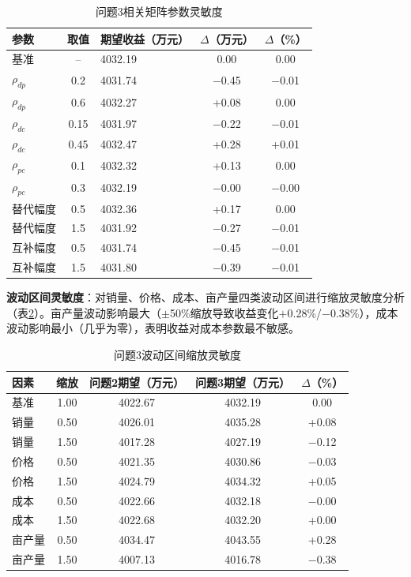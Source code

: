 \documentclass[12pt,a4paper]{article}
\begin{document}
\begin{table}[H]
\centering
\caption{问题3相关矩阵参数灵敏度}
\label{tab:sens_rho}
\begin{tabular}{lclcc}
\toprule
参数 & 取值 & 期望收益（万元） & $\Delta$（万元） & $\Delta$（\%） \\
\midrule
基准 & -- & 4032.19 & 0.00 & 0.00 \\
$\rho_{dp}$ & 0.2 & 4031.74 & $-$0.45 & $-$0.01 \\
$\rho_{dp}$ & 0.6 & 4032.27 & +0.08 & 0.00 \\
$\rho_{dc}$ & 0.15 & 4031.97 & $-$0.22 & $-$0.01 \\
$\rho_{dc}$ & 0.45 & 4032.47 & +0.28 & +0.01 \\
$\rho_{pc}$ & 0.1 & 4032.32 & +0.13 & 0.00 \\
$\rho_{pc}$ & 0.3 & 4032.19 & $-$0.00 & $-$0.00 \\
替代幅度 & 0.5 & 4032.36 & +0.17 & 0.00 \\
替代幅度 & 1.5 & 4031.92 & $-$0.27 & $-$0.01 \\
互补幅度 & 0.5 & 4031.74 & $-$0.45 & $-$0.01 \\
互补幅度 & 1.5 & 4031.80 & $-$0.39 & $-$0.01 \\
\bottomrule
\end{tabular}
\end{table}

\textbf{波动区间灵敏度}：对销量、价格、成本、亩产量四类波动区间进行缩放灵敏度分析（表\ref{tab:sens_range}）。亩产量波动影响最大（$\pm$50\%缩放导致收益变化$+$0.28\%/$-$0.38\%），成本波动影响最小（几乎为零），表明收益对成本参数最不敏感。

\begin{table}[H]
\centering
\caption{问题3波动区间缩放灵敏度}
\label{tab:sens_range}
\begin{tabular}{lcccc}
\toprule
因素 & 缩放 & 问题2期望（万元） & 问题3期望（万元） & $\Delta$（\%） \\
\midrule
基准 & 1.00 & 4022.67 & 4032.19 & 0.00 \\
销量 & 0.50 & 4026.01 & 4035.28 & +0.08 \\
销量 & 1.50 & 4017.28 & 4027.19 & $-$0.12 \\
价格 & 0.50 & 4021.35 & 4030.86 & $-$0.03 \\
价格 & 1.50 & 4024.79 & 4034.32 & +0.05 \\
成本 & 0.50 & 4022.66 & 4032.18 & $-$0.00 \\
成本 & 1.50 & 4022.68 & 4032.20 & +0.00 \\
亩产量 & 0.50 & 4034.47 & 4043.55 & +0.28 \\
亩产量 & 1.50 & 4007.13 & 4016.78 & $-$0.38 \\
\bottomrule
\end{tabular}
\end{table}
\end{document}
